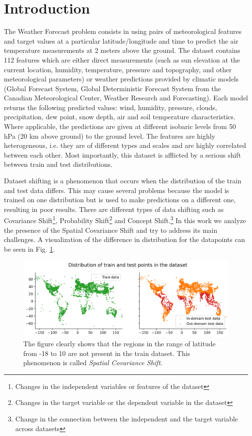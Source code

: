 \documentclass{article}
\begin{document}
	
	
\section{Introduction}
    The Weather Forecast problem consists in using pairs of meteorological features and target values at a particular latitude/longitude and time to predict the air temperature measurements at 2 meters above the ground. The dataset contains 112 features which are either direct measurements (such as sun elevation at the current location, humidity, temperature, pressure and topography, and other meteorological parameters) or weather predictions provided by climatic models (Global Forecast System, Global Deterministic Forecast System from the Canadian Meteorological Center, Weather Research and Forecasting). Each model returns the following predicted values: wind, humidity, pressure, clouds, precipitation, dew point, snow depth, air and soil temperature characteristics. Where applicable, the predictions are given at different isobaric levels from 50 hPa (20 km above ground) to the ground level. The features are highly heterogeneous, i.e. they are of different types and scales and are highly correlated between each other. Most importantly, this dataset is afflicted by a serious shift between train and test distributions. 
    
    Dataset shifting is a phenomenon that occurs when the distribution of the train and test data differs. This may cause several problems because the model is trained on one distribution but is used to make predictions on a different one, resulting in poor results. There are different types of data shifting such as 
    Covariance Shift\footnote{Changes in the independent variables or features of the dataset},
    Probability Shift\footnote{Changes in the target variable or the dependent variable in the dataset}
    and Concept Shift.\footnote{Change in the connection between the independent and the target variable across datasets}
    In this work we analyze the presence of the Spatial Covariance Shift and try to address its main challenges. A visualization of the difference in distribution for the datapoints can be seen in Fig. \ref{fig:train-test-diff}.
    

    \begin{figure}[h]
        \centering
        \includegraphics[width=\linewidth]{assets/train-test-diff.png}
        \caption{The figure clearly shows that the regions in the range of latitude from -18 to 10 are not present in the train dataset. This phenomenon is called \textit{Spatial Covariance Shift}.}
        \label{fig:train-test-diff}
    \end{figure}
\end{document}
